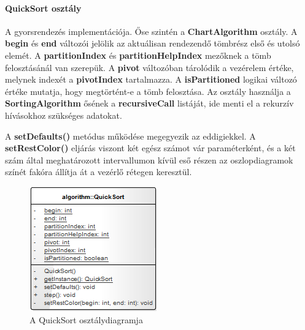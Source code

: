 \documentclass{elteikthesis}
\begin{document}
\paragraph{QuickSort osztály}
A gyorsrendezés implementációja. Őse szintén a \textbf{ChartAlgorithm} osztály. A \textbf{begin} és \textbf{end} változói jelölik az aktuálisan rendezendő tömbrész első és utolsó elemét. A \textbf{partitionIndex} és \textbf{partitionHelpIndex} mezőknek a tömb felosztásánál van szerepük. A \textbf{pivot} változóban tárolódik a vezérelem értéke, melynek indexét a \textbf{pivotIndex} tartalmazza. A \textbf{isPartitioned} logikai változó értéke mutatja, hogy megtörtént-e a tömb felosztása. Az osztály használja a \textbf{SortingAlgorithm} ősének a \textbf{recursiveCall} listáját, ide menti el a rekurzív hívásokhoz szükséges adatokat.\par
A \textbf{setDefaults()} metódus működése megegyezik az eddigiekkel. A \textbf{setRestColor()} eljárás viszont két egész számot vár paraméterként, és a két szám által meghatározott intervallumon kívül eső részen az oszlopdiagramok színét fakóra állítja át a vezérlő rétegen keresztül.
\begin{figure}[H]
	\centering
	\includegraphics{pics/class/QuickSort.png}
	\caption{A QuickSort osztálydiagramja}
\end{figure}
\end{document}
